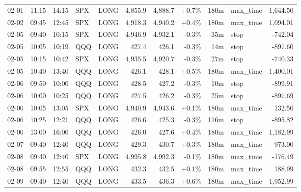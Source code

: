 \documentclass[11pt,a4paper,twoside]{article}
\begin{document}
\begin{center}
\begin{longtable}{>{\color{txtmain}}l l l l l r r r r >{\color{txtmain}}l r}
02-01 & 11:15 & 14:15 & SPX & LONG & 4,855.9 & 4,888.7 & \textcolor{wingreen}{+0.7\%} & 180m & max\_time & \textcolor{wingreen}{1,644.50} \\
02-02 & 09:45 & 12:45 & SPX & LONG & 4,918.3 & 4,940.2 & \textcolor{wingreen}{+0.4\%} & 180m & max\_time & \textcolor{wingreen}{1,094.01} \\
02-05 & 09:40 & 10:15 & SPX & LONG & 4,946.9 & 4,932.1 & \textcolor{lossred}{-0.3\%} & 35m & stop & \textcolor{lossred}{-742.04} \\
02-05 & 10:05 & 10:19 & QQQ & LONG & 427.4 & 426.1 & \textcolor{lossred}{-0.3\%} & 14m & stop & \textcolor{lossred}{-897.60} \\
02-05 & 10:15 & 10:42 & SPX & LONG & 4,935.5 & 4,920.7 & \textcolor{lossred}{-0.3\%} & 27m & stop & \textcolor{lossred}{-740.33} \\
02-05 & 10:40 & 13:40 & QQQ & LONG & 426.1 & 428.1 & \textcolor{wingreen}{+0.5\%} & 180m & max\_time & \textcolor{wingreen}{1,400.01} \\
02-06 & 09:50 & 10:00 & QQQ & LONG & 428.5 & 427.2 & \textcolor{lossred}{-0.3\%} & 10m & stop & \textcolor{lossred}{-899.91} \\
02-06 & 10:00 & 10:25 & QQQ & LONG & 427.5 & 426.2 & \textcolor{lossred}{-0.3\%} & 25m & stop & \textcolor{lossred}{-897.69} \\
02-06 & 10:05 & 13:05 & SPX & LONG & 4,940.9 & 4,943.6 & \textcolor{wingreen}{+0.1\%} & 180m & max\_time & \textcolor{wingreen}{132.50} \\
02-06 & 10:25 & 12:21 & QQQ & LONG & 426.6 & 425.3 & \textcolor{lossred}{-0.3\%} & 116m & stop & \textcolor{lossred}{-895.82} \\
02-06 & 13:00 & 16:00 & QQQ & LONG & 426.0 & 427.6 & \textcolor{wingreen}{+0.4\%} & 180m & max\_time & \textcolor{wingreen}{1,182.99} \\
02-07 & 09:40 & 12:40 & QQQ & LONG & 429.3 & 430.7 & \textcolor{wingreen}{+0.3\%} & 180m & max\_time & \textcolor{wingreen}{973.00} \\
02-08 & 09:40 & 12:40 & SPX & LONG & 4,995.8 & 4,992.3 & \textcolor{lossred}{-0.1\%} & 180m & max\_time & \textcolor{lossred}{-176.49} \\
02-08 & 09:55 & 12:55 & QQQ & LONG & 432.3 & 432.5 & \textcolor{wingreen}{+0.1\%} & 180m & max\_time & \textcolor{wingreen}{188.99} \\
02-09 & 09:40 & 12:40 & QQQ & LONG & 433.5 & 436.3 & \textcolor{wingreen}{+0.6\%} & 180m & max\_time & \textcolor{wingreen}{1,952.99} \\

\end{longtable}
\end{center}
\end{document}
